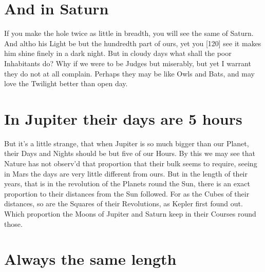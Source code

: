 \documentclass[letterpaper]{book}
\begin{document}
\section{And in Saturn}

If you make the hole twice as little in breadth, you will see the same of
Saturn. And altho his Light be but the hundredth part of ours, yet you
[120] see it makes him shine finely in a dark night. But in cloudy days what
shall the poor Inhabitants do? Why if we were to be Judges but miserably,
but yet I warrant they do not at all complain. Perhaps they may be like
Owls and Bats, and may love the Twilight better than open day.


\section{In Jupiter their days are 5 hours}

But it's a little strange, that when Jupiter is so much bigger than our
Planet, their Days and Nights should be but five of our Hours. By this we
may see that Nature has not observ'd that proportion that their bulk seems
to require, seeing in Mars the days are very little different from ours. But
in the length of their years, that is in the revolution of the Planets round
the Sun, there is an exact proportion to their distances from the Sun
followed. For as the Cubes of their distances, so are the Squares of their
Revolutions, as Kepler first found out. Which proportion the Moons of
Jupiter and Saturn keep in their Courses round those.


\section{Always the same length}
\end{document}
